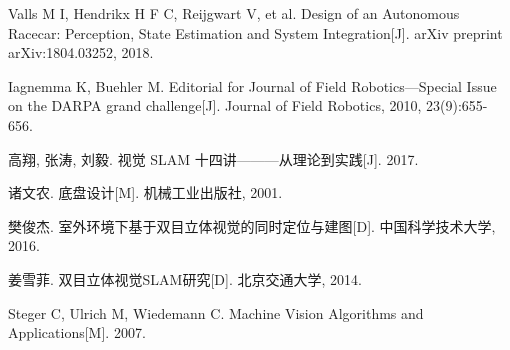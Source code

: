 \newpage
{}
\begin{thebibliography}{0}
	
%	

	
	Valls M I, Hendrikx H F C, Reijgwart V, et al. Design of an Autonomous Racecar: Perception, State Estimation and System Integration[J]. arXiv preprint arXiv:1804.03252, 2018.
	
	Iagnemma K, Buehler M. Editorial for Journal of Field Robotics—Special Issue on the DARPA grand challenge[J]. Journal of Field Robotics, 2010, 23(9):655-656.
	
	高翔, 张涛, 刘毅. 视觉 SLAM 十四讲———从理论到实践[J]. 2017.
	

	诸文农. 底盘设计[M]. 机械工业出版社, 2001.
	

	樊俊杰. 室外环境下基于双目立体视觉的同时定位与建图[D]. 中国科学技术大学, 2016.

	姜雪菲. 双目立体视觉SLAM研究[D]. 北京交通大学, 2014.
	
	Steger C, Ulrich M, Wiedemann C. Machine Vision Algorithms and Applications[M]. 2007.
	
\end{thebibliography}
